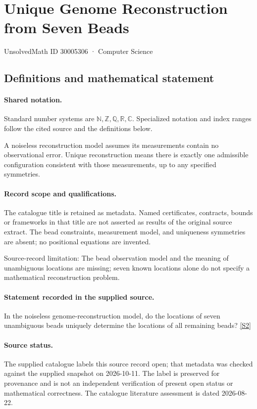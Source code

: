 \documentclass[11pt]{article}
\newcommand{\sref}[2]{\hyperlink{source:#1:#2}{[S#2]}}
\begin{document}
\setcounter{section}{30005305}
\section{Unique Genome Reconstruction from Seven Beads}\label{30005306}
{\small\sffamily UnsolvedMath ID 30005306 · Computer Science}
\subsection{Definitions and mathematical statement}

\paragraph{Shared notation.}Standard number systems are $\mathbb N,\mathbb Z,\mathbb Q,\mathbb R,\mathbb C$. Specialized notation and index ranges follow the cited source and the definitions below.


A noiseless reconstruction model assumes its measurements contain no observational error. Unique reconstruction means there is exactly one admissible configuration consistent with those measurements, up to any specified symmetries.
\paragraph{Record scope and qualifications.}
The catalogue title is retained as metadata. Named certificates, contracts, bounds or frameworks in that title are not asserted as results of the original source extract.
The bead constraints, measurement model, and uniqueness symmetries are absent; no positional equations are invented.

Source-record limitation: The bead observation model and the meaning of unambiguous locations are missing; seven known locations alone do not specify a mathematical reconstruction problem.
\paragraph{Statement recorded in the supplied source.}
In the noiseless genome-reconstruction model, do the locations of seven unambiguous beads uniquely determine the locations of all remaining beads? \sref{30005306}{2}
\paragraph{Source status.}
The supplied catalogue labels this source record open; that metadata was checked against the supplied snapshot on 2026-10-11. The label is preserved for provenance and is not an independent verification of present open status or mathematical correctness. The catalogue literature assessment is dated 2026-08-22.
\end{document}
